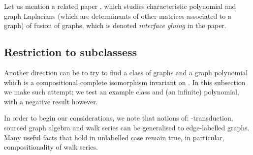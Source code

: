 Let us mention a related paper \cite{contrerasGluingLaplacians20}, which studies characteristic polynomial and graph Laplacians (which are determinants of other matrices associated to a graph) of fusion of graphs, which is denoted \emph{interface gluing} in the paper.
\subsection{Restriction to subclassess}\label{subsec:subclassess}
Another direction can be to try to find a class of graphs \Cc and a graph polynomial which is a compositional complete isomorphism invariant on \Cc. In this subsection we make such attempt; we test an example class and (an infinite) polynomial, with a negative result however.

In order to begin our considerations, we note that notions of: \mso-transduction, sourced graph algebra and walk series can be generalised to edge-labelled graphs. Many useful facts that hold in unlabelled case remain true, in particular, compositionality of walk series.

